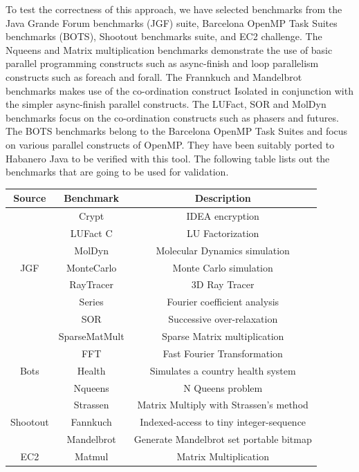 To test the correctness of this approach, we have selected benchmarks from the Java Grande Forum benchmarks (JGF) suite, Barcelona OpenMP Task Suites benchmarks (BOTS), Shootout benchmarks suite, and EC2 challenge. The Nqueens and Matrix multiplication benchmarks demonstrate the use of basic parallel programming constructs such as async-finish and loop parallelism constructs such as foreach and forall. The Frannkuch and Mandelbrot benchmarks makes use of the co-ordination construct Isolated in conjunction with the simpler async-finish parallel constructs. The LUFact, SOR and MolDyn benchmarks focus on the co-ordination constructs such as phasers and futures. The BOTS  benchmarks belong to the Barcelona OpenMP Task Suites and focus on various parallel constructs of OpenMP. They have been suitably ported to Habanero Java  to be verified with this tool. The following table lists out the benchmarks that are going to be used for validation. 

\begin{tabular}{|c|c|c|}
\hline
\textbf{Source} & \textbf{Benchmark} & \textbf{Description} \\
\hline
\hline
      & Crypt & IDEA encryption \\
	& LUFact C & LU Factorization \\
  	   & MolDyn & Molecular Dynamics simulation \\
JGF & MonteCarlo & Monte Carlo simulation \\
      & RayTracer & 3D Ray Tracer \\
      & Series & Fourier coefficient analysis \\
      & SOR & Successive over-relaxation \\
      & SparseMatMult & Sparse Matrix multiplication \\
      \hline
      & FFT  & Fast Fourier Transformation \\
	Bots & Health & Simulates a country health system \\
& Nqueens & N Queens problem \\
& Strassen & Matrix Multiply with Strassen’s method \\
\hline
Shootout & Fannkuch & Indexed-access to tiny integer-sequence \\
& Mandelbrot & Generate Mandelbrot set portable bitmap \\
\hline
EC2 & Matmul & Matrix Multiplication \\
\hline
\end{tabular}
\\
\\

